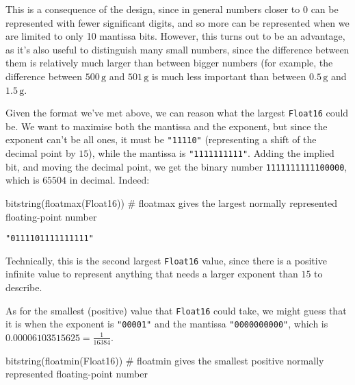 \documentclass[
  letterpaper,
  DIV=11,
  numbers=noendperiod]{scrreprt}
\newenvironment{Shaded}{\begin{snugshade}}{\end{snugshade}}
\newcommand{\CommentTok}[1]{\textcolor[rgb]{0.37,0.37,0.37}{#1}}
\newcommand{\DataTypeTok}[1]{\textcolor[rgb]{0.68,0.00,0.00}{#1}}
\newcommand{\FunctionTok}[1]{\textcolor[rgb]{0.28,0.35,0.67}{#1}}
\newcommand{\NormalTok}[1]{\textcolor[rgb]{0.00,0.23,0.31}{#1}}
\begin{document}
This is a consequence of the design, since in general numbers closer to
0 can be represented with fewer significant digits, and so more can be
represented when we are limited to only 10 mantissa bits. However, this
turns out to be an advantage, as it's also useful to distinguish many
small numbers, since the difference between them is relatively much
larger than between bigger numbers (for example, the difference between
\(500\,\mathrm{g}\) and \(501\,\mathrm{g}\) is much less important than
between \(0.5\,\mathrm{g}\) and \(1.5\,\mathrm{g}\).

Given the format we've met above, we can reason what the largest
\texttt{Float16} could be. We want to maximise both the mantissa and the
exponent, but since the exponent can't be all ones, it must be
\texttt{"11110"} (representing a shift of the decimal point by \(15\)),
while the mantissa is \texttt{"1111111111"}. Adding the implied bit, and
moving the decimal point, we get the binary number
\texttt{1111111111100000}, which is \(65504\) in decimal. Indeed:

\begin{Shaded}
\begin{Highlighting}[]
\FunctionTok{bitstring}\NormalTok{(}\FunctionTok{floatmax}\NormalTok{(}\DataTypeTok{Float16}\NormalTok{)) }\CommentTok{\# floatmax gives the largest normally represented floating{-}point number}
\end{Highlighting}
\end{Shaded}

\begin{verbatim}
"0111101111111111"
\end{verbatim}

Technically, this is the second largest \texttt{Float16} value, since
there is a positive infinite value to represent anything that needs a
larger exponent than \(15\) to describe.

As for the smallest (positive) value that \texttt{Float16} could take,
we might guess that it is when the exponent is \texttt{"00001"} and the
mantissa \texttt{"0000000000"}, which is
\(0.00006103515625 = \tfrac{1}{16384}\).

\begin{Shaded}
\begin{Highlighting}[]
\FunctionTok{bitstring}\NormalTok{(}\FunctionTok{floatmin}\NormalTok{(}\DataTypeTok{Float16}\NormalTok{)) }\CommentTok{\# floatmin gives the smallest positive normally represented floating{-}point number}
\end{Highlighting}
\end{Shaded}
\end{document}
